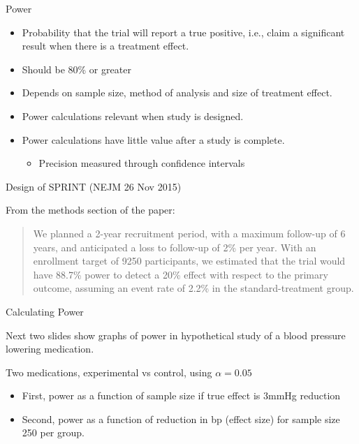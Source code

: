 \documentclass[ignorenonframetext,]{beamer}
\providecommand{\tightlist}{%
  \setlength{\itemsep}{0pt}\setlength{\parskip}{0pt}}
\begin{document}
\begin{frame}{Power}
\protect\hypertarget{power}{}

\begin{itemize}
\item
  Probability that the trial will report a true positive, i.e., claim a
  significant result when there is a treatment effect.
\item
  Should be 80\% or greater
\item
  Depends on sample size, method of analysis and size of treatment
  effect.
\item
  Power calculations relevant when study is designed.
\item
  Power calculations have little value after a study is complete.

  \begin{itemize}
  \tightlist
  \item
    Precision measured through confidence intervals
  \end{itemize}
\end{itemize}

\end{frame}

\begin{frame}{Design of SPRINT (NEJM 26 Nov 2015)}
\protect\hypertarget{design-of-sprint-nejm-26-nov-2015}{}

From the methods section of the paper:

\begin{quote}
We planned a 2-year recruitment period, with a maximum follow-up of 6 years, and anticipated a loss to follow-up of 2\% per year. With an enrollment target of 9250 participants, we estimated  that the trial would have 88.7\% power to detect  a 20\% effect with respect to the primary outcome, assuming an event rate of 2.2\% in the standard-treatment group.
\end{quote}

\end{frame}

\begin{frame}{Calculating Power}
\protect\hypertarget{calculating-power}{}

Next two slides show graphs of power in hypothetical study of a blood
pressure lowering medication. \medskip

Two medications, experimental vs control, using \(\alpha = 0.05\)

\begin{itemize}
\item
  First, power as a function of sample size if true effect is 3mmHg
  reduction
\item
  Second, power as a function of reduction in bp (effect size) for
  sample size 250 per group.
\end{itemize}

\end{frame}
\end{document}
